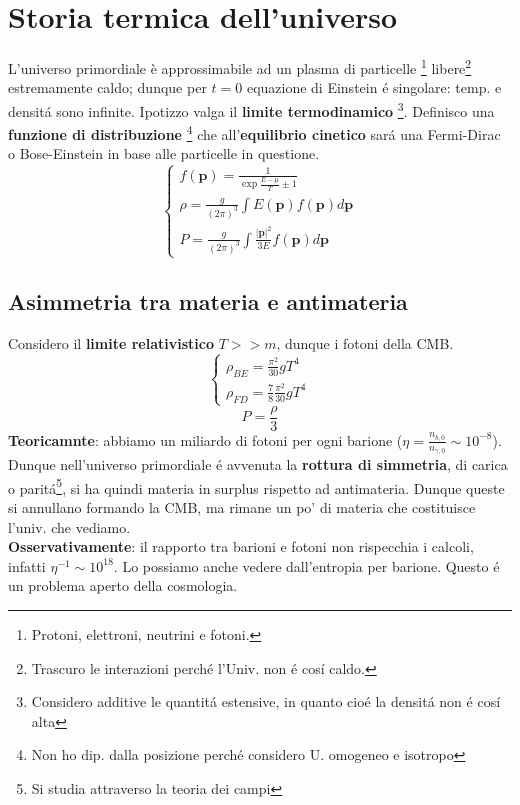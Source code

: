 \documentclass[12pt, a4paper]{article}
\begin{document}
\section{Storia termica dell'universo }
L'universo primordiale è approssimabile ad un plasma di particelle \footnote{Protoni, elettroni, neutrini e fotoni.} libere\footnote{Trascuro le interazioni perch\'{e} l'Univ. non \'{e} cos\'{i} caldo.} estremamente caldo; dunque per  $t=0$ equazione di Einstein \'{e} singolare: temp. e densit\'{a} sono infinite. Ipotizzo valga il \textbf{limite termodinamico} \footnote{Considero additive le quantit\'{a} estensive, in quanto cio\'{e} la densit\'{a} non \'{e} cos\'{i} alta}. Definisco una \textbf{funzione di distribuzione} \footnote{Non ho dip. dalla posizione perch\'{e} considero U. omogeneo e isotropo} che all'\textbf{equilibrio cinetico} sar\'{a} una Fermi-Dirac o Bose-Einstein in base alle particelle in questione.
\begin{equation}
     \begin{cases}
        f(\textbf{p})=\frac{1}{\exp{\frac{E-\mu}{T}}\pm 1}
        \\
        \rho=\frac{g}{(2\pi)^3}\int E(\textbf{p}) f(\textbf{p})d\textbf{p}
        \\
        P=\frac{g}{(2\pi)^3}\int \frac{|\textbf{p}|^2}{3E} f(\textbf{p})d\textbf{p}
     \end{cases}
\end{equation}
\subsection{Asimmetria tra materia e antimateria}
Considero il \textbf{limite relativistico} $T >> m$, dunque i fotoni della CMB.
\begin{equation}
     \begin{cases}
        \rho_{BE}=\frac{\pi^2}{30}gT^4
        \\
        \rho_{FD}=\frac{7}{8}\frac{\pi^2}{30}gT^4
     \end{cases}
\end{equation}
\begin{equation}
    P=\frac{\rho}{3}
\end{equation}
\textbf{Teoricamnte}: abbiamo un miliardo di fotoni per ogni barione ($\eta=\frac{n_{b,0}}{n_{\gamma,0}}\sim 10^{-8}$). Dunque nell'universo primordiale \'{e} avvenuta la \textbf{rottura di simmetria}, di carica o parit\'{a}\footnote{Si studia attraverso la teoria dei campi}, si ha quindi materia in surplus rispetto ad antimateria. Dunque queste si annullano formando la CMB, ma rimane un po' di materia che costituisce l'univ. che vediamo.\\
\textbf{Osservativamente}: il rapporto tra barioni e fotoni non rispecchia i calcoli, infatti $\eta^{-1}\sim 10^{18}$. Lo possiamo anche vedere dall'entropia per barione. Questo \'{e} un problema aperto della cosmologia.
\end{document}
